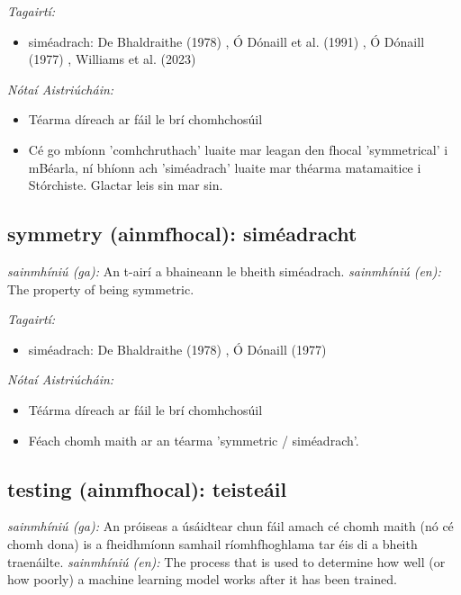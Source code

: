 \documentclass{article}
\begin{document}
 \noindent \textit{Tagairtí:}
\begin{itemize}
	\item siméadrach: De Bhaldraithe (1978) \cite{de-bhaldraithe}, Ó Dónaill et al. (1991) \cite{focloir-beag}, Ó Dónaill (1977) \cite{odonaill}, Williams et al. (2023) \cite{storchiste}
\end{itemize}

 \noindent \textit{Nótaí Aistriúcháin:}
\begin{itemize}
	\item Téarma díreach ar fáil le brí chomhchosúil
	\item Cé go mbíonn 'comhchruthach' luaite mar leagan den fhocal 'symmetrical' i mBéarla, ní bhíonn ach 'siméadrach' luaite mar théarma matamaitice i Stórchiste. Glactar leis sin mar sin.
\end{itemize}


\subsection*{symmetry (ainmfhocal): siméadracht} 
 \noindent \textit{sainmhíniú (ga):} An t-airí a bhaineann le bheith siméadrach.
\newline\newline
 \noindent \textit{sainmhíniú (en):} The property of being symmetric.
\newline

 \noindent \textit{Tagairtí:}
\begin{itemize}
	\item siméadrach: De Bhaldraithe (1978) \cite{de-bhaldraithe}, Ó Dónaill (1977) \cite{odonaill}
\end{itemize}

 \noindent \textit{Nótaí Aistriúcháin:}
\begin{itemize}
	\item Téárma díreach ar fáil le brí chomhchosúil
	\item Féach chomh maith ar an téarma 'symmetric / siméadrach'.
\end{itemize}


\subsection*{testing (ainmfhocal): teisteáil} 
 \noindent \textit{sainmhíniú (ga):} An próiseas a úsáidtear chun fáil amach cé chomh maith (nó cé chomh dona) is a fheidhmíonn samhail ríomhfhoghlama tar éis di a bheith traenáilte.
\newline\newline
 \noindent \textit{sainmhíniú (en):} The process that is used to determine how well (or how poorly) a machine learning model works after it has been trained.
\newline
\end{document}
